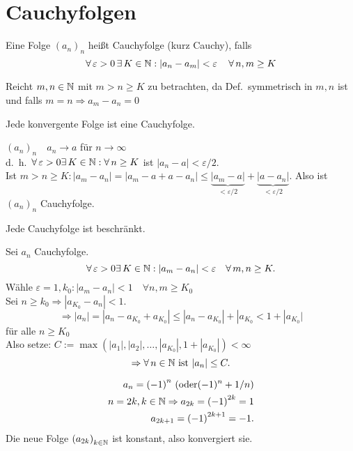 \documentclass[../ana1.tex]{subfiles}
\begin{document}
\setcounter{section}{8}

\section{Cauchyfolgen}
\begin{defi}[Cauchyfolge]
	Eine Folge \({(a_n)}_n\) heißt Cauchyfolge (kurz Cauchy), falls
	\[\forall \varepsilon > 0 \,\exists K\in\N: |a_n-a_m| < \varepsilon \quad \, \forall n,m\geq K \]
\end{defi}
\begin{bem}
	Reicht \(m,n\in\mathbb{N} \) mit \( m>n\geq K \) zu betrachten, da Def.\ symmetrisch in \(m,n\) ist und falls \(m=n \Rightarrow a_m-a_n=0\)
\end{bem}
\begin{lem}
	Jede konvergente Folge ist eine Cauchyfolge.
\end{lem}
\begin{bew}
	\( {(a_n)}_n \quad a_n \rightarrow a \) für \(n\rightarrow\infty \) \\
	d.\ h.\  \( \forall \varepsilon > 0 \exists K \in \N: \forall n\geq K \) ist \( |a_n-a| < \varepsilon/2 \).\\
	Ist \(m>n\geq K: |a_m -a_n| = |a_m-a+a-a_n| \leq \underbrace{|a_m-a|}_{<\varepsilon/2} + \underbrace{ |a-a_n| }_{<\varepsilon/2}. \) Also ist \({(a_n)}_n\) Cauchyfolge.
\end{bew}
\begin{lem}
	Jede Cauchyfolge ist beschränkt.
\end{lem}
\begin{bew}
	Sei \(a_n\) Cauchyfolge. 
	\[ \forall \varepsilon > 0 \exists K\in\N:|a_m-a_n| < \varepsilon \quad \forall m,n\geq K. \]
	Wähle \(\varepsilon = 1, k_0: |a_m-a_n| < 1 \quad \forall n,m\geq K_0 \) \\
	Sei \(n \geq k_0 \Rightarrow |a_{K_0} - a_n| < 1. \)
	\[ \Rightarrow |a_n| = |a_n - a_{K_0} + a_{K_0}| \leq |a_n - a_{K_0}| + |a_{K_0} < 1 + |a_{K_0}| \] für alle \(n\geq K_0\) \\
	Also setze: \( C := \max ( |a_1|,|a_2|,\ldots,|a_{K_0}|,1+|a_{K_0}| ) < \infty \) 
	\[ \Rightarrow \forall n\in\N \text{ ist } |a_n| \leq C. \]
\end{bew}
\begin{bsp}
	\begin{align*}
		a_n = {(-1)}^n \text{ (oder} (-1)^n + 1/n \text{)} \\
		n = 2k, k\in\mathbb{N} \Rightarrow a_{2k} = {(-1)}^{2k} = 1 \\
		a_{2k+1} = {(-1)}^{2k+1} = -1.
	\end{align*}
	Die neue Folge \( {(a_{2k})}_{k\in\mathbb{N}} \) ist konstant, also konvergiert sie.
\end{bsp}
\end{document}
